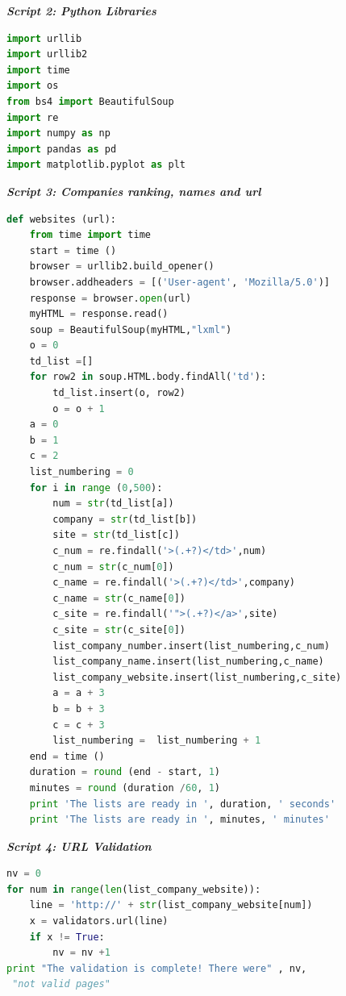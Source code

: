 \documentclass{book}
\begin{document}
\begin{center}
\textit{\textbf{Script 2: Python Libraries}}\label{p2}
\end{center}
\begin{lstlisting}[language=Python]
import urllib
import urllib2
import time
import os
from bs4 import BeautifulSoup
import re
import numpy as np
import pandas as pd
import matplotlib.pyplot as plt
\end{lstlisting}

\begin{center}
\textit{\textbf{Script 3: Companies ranking, names and url}}\label{p3}
\end{center}
\begin{lstlisting}[language=Python]
def websites (url): 
    from time import time
    start = time ()
    browser = urllib2.build_opener() 
    browser.addheaders = [('User-agent', 'Mozilla/5.0')]
    response = browser.open(url)
    myHTML = response.read()
    soup = BeautifulSoup(myHTML,"lxml")    
    o = 0
    td_list =[]
    for row2 in soup.HTML.body.findAll('td'):
        td_list.insert(o, row2)
        o = o + 1
    a = 0
    b = 1
    c = 2
    list_numbering = 0
    for i in range (0,500):        
        num = str(td_list[a])
        company = str(td_list[b])
        site = str(td_list[c])
        c_num = re.findall('>(.+?)</td>',num)  
        c_num = str(c_num[0])
        c_name = re.findall('>(.+?)</td>',company)
        c_name = str(c_name[0])
        c_site = re.findall('">(.+?)</a>',site)
        c_site = str(c_site[0])        
        list_company_number.insert(list_numbering,c_num)
        list_company_name.insert(list_numbering,c_name)
        list_company_website.insert(list_numbering,c_site)
        a = a + 3
        b = b + 3
        c = c + 3
        list_numbering =  list_numbering + 1 
    end = time ()
    duration = round (end - start, 1)
    minutes = round (duration /60, 1)
    print 'The lists are ready in ', duration, ' seconds'
    print 'The lists are ready in ', minutes, ' minutes'
\end{lstlisting}

\begin{center}
\textit{\textbf{Script 4: URL Validation}}\label{p4}
\end{center}
\begin{lstlisting}[language=Python]
nv = 0
for num in range(len(list_company_website)):
    line = 'http://' + str(list_company_website[num])
    x = validators.url(line)    
    if x != True:
        nv = nv +1
print "The validation is complete! There were" , nv,
 "not valid pages"
\end{lstlisting}
\end{document}
